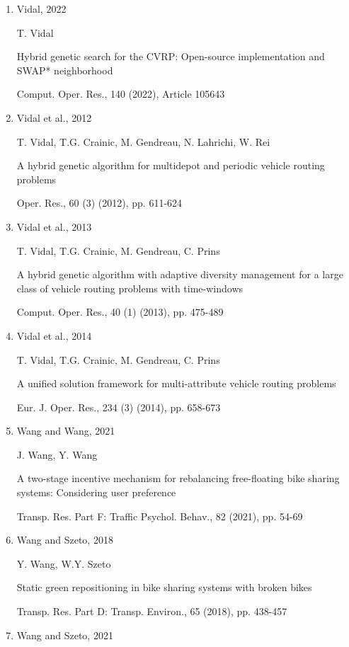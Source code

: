 \documentclass[
  english,
]{article}
\begin{document}
\begin{otherlanguage}{english}
\begin{enumerate}
  M. Usama, Y. Shen, O. Zahoor, Q. Bao

  Dockless bike-sharing system: Solving the problem of faulty bikes with simultaneous rebalancing
  operation

  J. Transp. Land Use, 13 (1) (2020), pp. 491-515
\item
  Vidal, 2022

  T. Vidal

  Hybrid genetic search for the CVRP: Open-source implementation and SWAP* neighborhood

  Comput. Oper. Res., 140 (2022), Article 105643
\item
  Vidal et al., 2012

  T. Vidal, T.G. Crainic, M. Gendreau, N. Lahrichi, W. Rei

  A hybrid genetic algorithm for multidepot and periodic vehicle routing problems

  Oper. Res., 60 (3) (2012), pp. 611-624
\item
  Vidal et al., 2013

  T. Vidal, T.G. Crainic, M. Gendreau, C. Prins

  A hybrid genetic algorithm with adaptive diversity management for a large class of vehicle routing
  problems with time-windows

  Comput. Oper. Res., 40 (1) (2013), pp. 475-489
\item
  Vidal et al., 2014

  T. Vidal, T.G. Crainic, M. Gendreau, C. Prins

  A unified solution framework for multi-attribute vehicle routing problems

  Eur. J. Oper. Res., 234 (3) (2014), pp. 658-673
\item
  Wang and Wang, 2021

  J. Wang, Y. Wang

  A two-stage incentive mechanism for rebalancing free-floating bike sharing systems: Considering
  user preference

  Transp. Res. Part F: Traffic Psychol. Behav., 82 (2021), pp. 54-69
\item
  Wang and Szeto, 2018

  Y. Wang, W.Y. Szeto

  Static green repositioning in bike sharing systems with broken bikes

  Transp. Res. Part D: Transp. Environ., 65 (2018), pp. 438-457
\item
  Wang and Szeto, 2021


\end{enumerate}
\end{otherlanguage}
\end{document}
